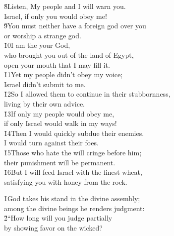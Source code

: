 \begin{poetry}
\poeml \v{8}Listen, My people and I will warn you. \\
\poemll    Israel, if only you would obey me! \\
\poeml \v{9}You must neither have a foreign god over you \\
\poemll    or worship a strange god. \\
\poeml \v{10}I am the  your God, \\
\poemll    who brought you out of the land of Egypt, \\
\poemlll       open your mouth that I may fill it. \\
\poeml \v{11}Yet my people didn't obey my voice; \\
\poemll    Israel didn't submit to me. \\
\poeml \v{12}So I allowed them to continue in their stubbornness, \\
\poemll    living by their own advice. \\
\poeml \v{13}If only my people would obey me, \\
\poemll    if only Israel would walk in my ways! \\
\poeml \v{14}Then I would quickly subdue their enemies. \\
\poemll    I would turn against their foes. \\
\poeml \v{15}Those who hate the  will cringe before him; \\
\poemll    their punishment will be permanent. \\
\poeml \v{16}But I will feed Israel with the finest wheat, \\
\poemll    satisfying you with honey from the rock.
\end{poetry}

\begin{poetry}
\poeml \v{1}God takes his stand in the divine assembly; \\
\poemll    among the divine beings he renders judgment: \\
\poeml \v{2}``How long will you judge partially \\
\poemll    by showing favor on the wicked?
\end{poetry}

